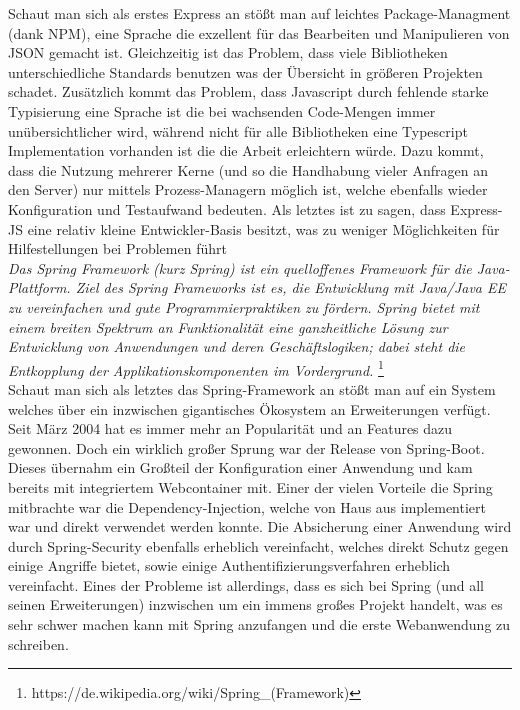 Schaut man sich als erstes Express an stößt man auf leichtes Package-Managment (dank NPM), eine Sprache die exzellent für das Bearbeiten und Manipulieren von JSON gemacht ist. Gleichzeitig ist das Problem, dass viele Bibliotheken unterschiedliche Standards benutzen was der Übersicht in größeren Projekten schadet. Zusätzlich kommt das Problem, dass Javascript durch fehlende starke Typisierung eine Sprache ist die bei wachsenden Code-Mengen immer unübersichtlicher wird, während nicht für alle Bibliotheken eine Typescript Implementation vorhanden ist die die Arbeit erleichtern würde. Dazu kommt, dass die Nutzung mehrerer Kerne (und so die Handhabung vieler Anfragen an den Server) nur mittels Prozess-Managern möglich ist, welche ebenfalls wieder Konfiguration und Testaufwand bedeuten. Als letztes ist zu sagen, dass Express-JS eine relativ kleine Entwickler-Basis besitzt, was zu weniger Möglichkeiten für Hilfestellungen bei Problemen führt \\


\emph{\glqq   
Das Spring Framework (kurz Spring) ist ein quelloffenes Framework für die Java-Plattform. Ziel des Spring Frameworks ist es, die Entwicklung mit Java/Java EE zu vereinfachen und gute Programmierpraktiken zu fördern. Spring bietet mit einem breiten Spektrum an Funktionalität eine ganzheitliche Lösung zur Entwicklung von Anwendungen und deren Geschäftslogiken; dabei steht die Entkopplung der Applikationskomponenten im Vordergrund.
\grqq} \footnote{https://de.wikipedia.org/wiki/Spring\_(Framework)} \\

Schaut man sich als letztes das Spring-Framework an stößt man auf ein System welches über ein inzwischen gigantisches Ökosystem an Erweiterungen verfügt. Seit März 2004 hat es immer mehr an Popularität und an Features dazu gewonnen. Doch ein wirklich großer Sprung war der Release von Spring-Boot. Dieses übernahm ein Großteil der Konfiguration einer Anwendung und kam bereits mit integriertem Webcontainer mit. Einer der vielen Vorteile die Spring mitbrachte war die Dependency-Injection, welche von Haus aus implementiert war und direkt verwendet werden konnte. Die Absicherung einer Anwendung wird durch Spring-Security ebenfalls erheblich vereinfacht, welches direkt Schutz gegen einige Angriffe bietet, sowie einige Authentifizierungsverfahren erheblich vereinfacht. Eines der Probleme ist allerdings, dass es sich bei Spring (und all seinen Erweiterungen) inzwischen um ein immens großes Projekt handelt, was es sehr schwer machen kann mit Spring anzufangen und die erste Webanwendung zu schreiben.


